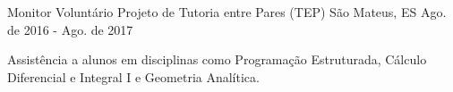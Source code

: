 \begin{cventries}
\cventry
{Monitor Voluntário} %
{Projeto de Tutoria entre Pares (TEP)} %
{São Mateus, ES} %
{Ago. de 2016 - Ago. de 2017} %
{
		\begin{cvitems} %
			\item {Assistência a alunos em disciplinas como Programação Estruturada, Cálculo Diferencial e Integral I e Geometria Analítica.}
		\end{cvitems}
}



\end{cventries}
